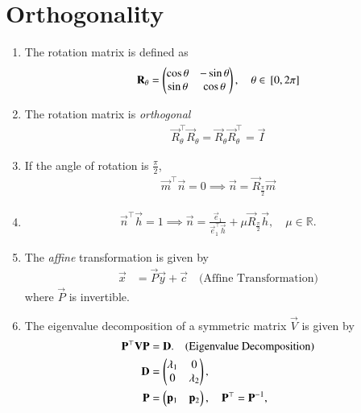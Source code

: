 \section{Orthogonality}
\begin{enumerate}[label=\thesection.\arabic*.,ref=\thesection.\theenumi]
\item The rotation matrix is defined as 
\begin{align}
	\mathbf{R}_{\theta} = \begin{pmatrix}\cos \theta & -\sin \theta  \\ \sin \theta  & \cos \theta  \end{pmatrix}, \quad \theta \in {}\left[0, 2\pi\right]
\end{align}
\item The rotation matrix is {\em orthogonal}
\begin{align}
	\vec{R}_{\theta}^{\top}\vec{R}_{\theta} = \vec{R}_{\theta}\vec{R}_{\theta}^{\top} = \vec{I}
\end{align}
\item If the angle of rotation is $\frac{\pi}{2}$,
	\label{prop:mat/rot/pi/2}
\begin{align}
	\vec{m}^{\top}\vec{n} = 0 \implies \vec{n} = \vec{R}_{\frac{\pi}{2}}\vec{m}
\end{align}
\item 
\begin{align}
	\label{eq:mat-nh}
	\vec{n}^{\top}\vec{h} = 1 \implies \vec{n} = \frac{\vec{e}_1}{\vec{e}_1^{\top}\vec{h}}+\mu\vec{R}_{\frac{\pi}{2}}\vec{h}, \quad \mu \in \mathbb{R}.
\end{align}


\item
	The {\em affine} transformation is given by 
    \begin{align}
	    \vec{x} &= \vec{P}\vec{y}+\vec{c} \quad \text{(Affine Transformation)}
\label{eq:conic_affine}
    \end{align}
	where $\vec{P}$ is invertible.

\item
	The eigenvalue decomposition of a symmetric matrix $\vec{V}$ is given by 
    \begin{align}
      \mathbf{P}^{\top}\mathbf{V}\mathbf{P} &= \mathbf{D}. \quad \text{(Eigenvalue Decomposition)}
      \\
      \mathbf{D} &= \begin{pmatrix}\lambda_1 & 0\\ 0 & \lambda_2\end{pmatrix}, 
      \\
      \mathbf{P} &= \begin{pmatrix}\mathbf{p}_1 & \mathbf{p}_2\end{pmatrix}, \quad \mathbf{P}^{\top}=\mathbf{P}^{-1},
    \end{align}


\end{enumerate}
\fi
